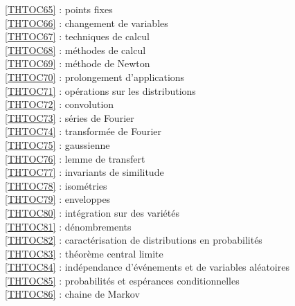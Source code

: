 \ref {THTOC65} : points fixes\\
\ref {THTOC66} : changement de variables\\
\ref {THTOC67} : techniques de calcul\\
\ref {THTOC68} : méthodes de calcul\\
\ref {THTOC69} : méthode de Newton\\
\ref {THTOC70} : prolongement d'applications\\
\ref {THTOC71} : opérations sur les distributions\\
\ref {THTOC72} : convolution\\
\ref {THTOC73} : séries de Fourier\\
\ref {THTOC74} : transformée de Fourier\\
\ref {THTOC75} : gaussienne\\
\ref {THTOC76} : lemme de transfert\\
\ref {THTOC77} : invariants de similitude\\
\ref {THTOC78} : isométries\\
\ref {THTOC79} : enveloppes\\
\ref {THTOC80} : intégration sur des variétés\\
\ref {THTOC81} : dénombrements\\
\ref {THTOC82} : caractérisation de distributions en probabilités\\
\ref {THTOC83} : théorème central limite\\
\ref {THTOC84} : indépendance d'événements et de variables aléatoires\\
\ref {THTOC85} : probabilités et espérances conditionnelles\\
\ref {THTOC86} : chaine de Markov\\
